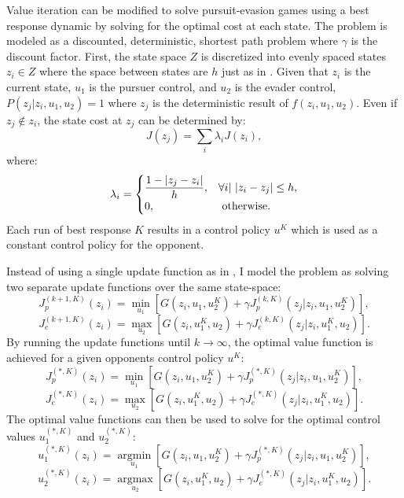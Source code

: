 Value iteration can be modified to solve pursuit-evasion games using a best response dynamic by solving for the optimal cost at each state. The problem is modeled as a discounted, deterministic, shortest path problem where $\gamma$ is the discount factor. First, the state space $Z$ is discretized into evenly spaced states $z_i \in Z$ where the space between states are $h$ just as in \cite{bardi2}. Given that $z_i$ is the current state, $u_1$ is the pursuer control, and $u_2$ is the evader control, $P(z_j|z_i,u_1,u_2) = 1$ where $z_j$ is the deterministic result of $f(z_i,u_1,u_2)$. Even if $z_j \notin z_i$, the state cost at $z_j$ can be determined by:
\begin{equation}\label{concomb}
J(z_j)  =  \sum_i\lambda_iJ(z_i),
\end{equation}
where:
\begin{equation}\label{lamb}
\lambda_i = 
\begin{cases}
\dfrac{1-|z_j-z_i|}{h}, & \forall i |\textnormal{ } |z_i-z_j|\leq h,\\
0, & \textnormal{ otherwise}.
\end{cases}
\end{equation} 
Each run of best response $K$ results in a control policy $u^K$ which is used as a constant control policy for the opponent. 

Instead of using a single update function as in , I model the problem as solving two separate update functions over the same state-space:
\begin{equation}\label{pbell}
J_p^{(k+1,K)}(z_i)= \underset{u_1 }{\operatorname{min }}[G(z_i,u_1,u_2^K)+\gamma J_p^{(k,K)}(z_j|z_i,u_1,u_2^K)],
\end{equation}
\begin{equation}\label{ebell}
J_e^{(k+1,K)}(z_i)= \underset{u_2 }{\operatorname{max }}[G(z_i,u_1^K,u_2)+\gamma J_e^{(k,K)}(z_j|z_i,u_1^K,u_2)].
\end{equation} 
By running the update functions until $k \rightarrow \infty$, the optimal value function is achieved for a given opponents control policy $u^K$:
\begin{equation}\label{popt}
J_p^{(*,K)}(z_i)= \underset{u_1 }{\operatorname{min }}[G(z_i,u_1,u_2^K)+\gamma J_p^{(*,K)}(z_j|z_i,u_1,u_2^K)],
\end{equation}
\begin{equation}\label{eopt}
J_e^{(*,K)}(z_i)= \underset{u_2 }{\operatorname{max }}[G(z_i,u_1^K,u_2)+\gamma J_e^{(*,K)}(z_j|z_i,u_1^K,u_2)].
\end{equation}
The optimal value functions can then be used to solve for the optimal control values $u_1^{(*,K)}$ and $u_2^{(*,K)}$:
\begin{equation}\label{pcont}
u_1^{(*,K)}(z_i)= \underset{u_1 }{\operatorname{arg min }}[G(z_i,u_1,u_2^K)+\gamma J_p^{(*,K)}(z_j|z_i,u_1,u_2^K)],
\end{equation}
\begin{equation}\label{econt}
u_2^{(*,K)}(z_i)= \underset{u_2 }{\operatorname{arg max }}[G(z_i,u_1^K,u_2)+\gamma J_e^{(*,K)}(z_j|z_i,u_1^K,u_2)].
\end{equation}  

